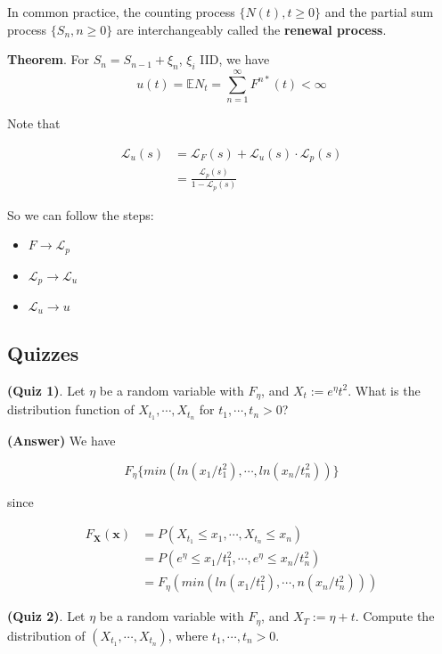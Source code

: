 \documentclass[12pt]{article}
\theoremstyle{nonumberbreak}
\begin{document}
In common practice, the counting process $\{N(t), t \ge 0 \}$ and the partial sum process $\{ S_n, n \ge 0 \}$ are interchangeably called the \textbf{renewal process}. 


\begin{theorem}
\textbf{Theorem}. For $S_n = S_{n-1} + \xi_n$, $\xi_i$ IID, we have
$$u(t) = \mathbb{E} N_t = \sum_{n=1}^\infty F^{n\ast} (t) < \infty$$
\end{theorem}


Note that 

$$
\begin{aligned}
\mathcal{L}_u (s) &= \mathcal{L}_F (s) + \mathcal{L}_u (s) \cdot \mathcal{L}_p (s) \\[8pt]
&= \frac{\mathcal{L}_p(s)}{1-\mathcal{L}_p(s)}
\end{aligned}
$$


So we can follow the steps:

\begin{itemize}
	\item $F \to \mathcal{L}_p$
	\item $\mathcal{L}_p \to \mathcal{L}_u$
	\item $\mathcal{L}_u \to u$
\end{itemize}


\subsection*{Quizzes}

\textbf{(Quiz 1)}. Let $\eta$ be a random variable with $F_\eta$, and $X_t := e^\eta t^2$. What is the distribution function of $X_{t_1}, \cdots, X_{t_n}$ for $t_1, \cdots, t_n >0$? 

\textbf{(Answer)} We have

$$
F_{\eta} \{ min \left( ln(x_1/t_1^2), \cdots, ln(x_n/t_n^2) \right) \}
$$

since

$$
\begin{aligned}
F_\mathbf{X} (\mathbf{x}) &= P(X_{t_1} \le x_1, \cdots, X_{t_n} \le x_n) \\[8pt]
&= P(e^\eta  \le x_1/t_1^2, \cdots, e^\eta  \le x_n/t_n^2)  \\[8pt]
&= F_\eta (min (ln(x_1/t_1^2), \cdots, n(x_n/t_n^2)))
\end{aligned}
$$


\textbf{(Quiz 2)}. Let $\eta$ be a random variable with $F_\eta$, and $X_T := \eta + t$. Compute the distribution of $(X_{t_1}, \cdots, X_{t_n})$, where $t_1, \cdots, t_n >0$. 
\end{document}
